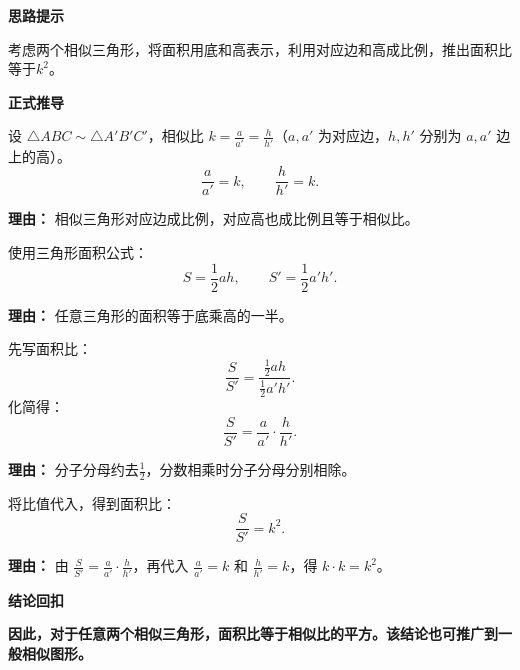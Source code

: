 \begin{proofbox}
	\textbf{\textcolor{CProof}{思路提示}}

	考虑两个相似三角形，将面积用底和高表示，利用对应边和高成比例，推出面积比等于$k^2$。

	\medskip
	\textbf{\textcolor{CProof}{正式推导}}
	\begin{description}[style=nextline, leftmargin=2.8em, labelsep=0.5em, itemsep=0.55em]
		\item[\textbf{步骤一（设对应元素）：}]
			设 $\triangle ABC\sim\triangle A'B'C'$，相似比 $k=\frac{a}{a'}=\frac{h}{h'}$（$a,a'$ 为对应边，$h,h'$ 分别为 $a,a'$ 边上的高）。
			\[
				\frac{a}{a'}=k,
				\qquad
				\frac{h}{h'}=k.
			\]
			\par\textbf{理由：} 相似三角形对应边成比例，对应高也成比例且等于相似比。

		\item[\textbf{步骤二（写出面积公式）：}]
			使用三角形面积公式：
			\[
				S=\frac12 a h,
				\qquad
				S'=\frac12 a' h'.
			\]
			\par\textbf{理由：} 任意三角形的面积等于底乘高的一半。

		\item[\textbf{步骤三（求面积比并化简）：}]
			先写面积比：
			\[
				\frac{S}{S'} = \frac{\frac12 a h}{\frac12 a' h'}.
			\]
			化简得：
			\[
				\frac{S}{S'} = \frac{a}{a'}\cdot\frac{h}{h'}.
			\]
			\par\textbf{理由：} 分子分母约去$\frac12$，分数相乘时分子分母分别相除。

		\item[\textbf{步骤四（代入相似比得结论）：}]
			将比值代入，得到面积比：
			\[
				\frac{S}{S'} = k^2.
			\]
			\par\textbf{理由：} 由 $\frac{S}{S'}=\frac{a}{a'}\cdot\frac{h}{h'}$，再代入 $\frac{a}{a'}=k$ 和 $\frac{h}{h'}=k$，得 $k\cdot k=k^2$。
	\end{description}

	\medskip
	\textbf{\textcolor{CProof}{结论回扣}}

	\textbf{因此，对于任意两个相似三角形，面积比等于相似比的平方。该结论也可推广到一般相似图形。}
\end{proofbox}
